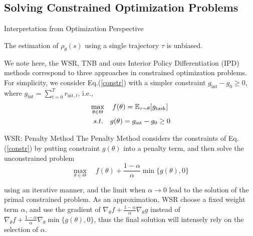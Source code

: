 \documentclass[10pt,hyperref={CJKbookmarks=true},envcountsect,mathserif]{beamer}
\begin{document}
\subsection{Solving Constrained Optimization Problems}
\begin{frame}{Interpretation from Optimization Perspective}

\begin{theorem}
\label{prop_1}
The estimation of $\rho_\theta(s)$ using a single trajectory $\tau$ is unbiased.
\end{theorem}
We note here, the WSR, TNB and ours Interior Policy Differentiation (IPD) methods correspond to three approaches in constrained optimization problems. For simplicity, we consider Eq.(\ref{constr}) with a simpler constraint $g_{\mathrm{int}} - g_0 \ge 0$, where $g_{\mathrm{int}} = \sum_{t=0}^T r_{\mathrm{int},t}$, i.e.,
\begin{equation*}
\begin{split}
&\max_{\theta\in \Theta} \quad f(\theta) = \mathbb{E}_{\tau \sim {\theta}} {[g_\mathrm{task}]} \\
& \begin{array}{r@{\quad}r@{}l@{\quad}l}
s.t.&g(\theta) =g_{\mathrm{int}} - g_0 \geq 0 \\
\end{array}
\end{split}
\end{equation*}

\end{frame}



\begin{frame}{WSR: Penalty Method}
The Penalty Method considers the constraints of Eq.(\ref{constr}) by putting constraint $g(\theta)$ into a penalty term, and then solve the unconstrained problem
\begin{equation}
    \max_{\theta\in \Theta} \quad f(\theta) + \frac{1-\alpha}{\alpha}\min\{g(\theta),0\}
\end{equation}

using an iterative manner, and the limit when $\alpha \rightarrow 0$ lead to the solution of the primal constrained problem. As an approximation, WSR choose a fixed weight term $\alpha$, and use the gradient of $\nabla_{\theta}f + \frac{1-\alpha}{\alpha}\nabla_{\theta}g$ instead of $\nabla_{\theta}f + \frac{1-\alpha}{\alpha}\nabla_{\theta}\min\{g(\theta),0\}$, thus the final solution will intensely rely on the selection of $\alpha$.
\end{frame}
\end{document}
